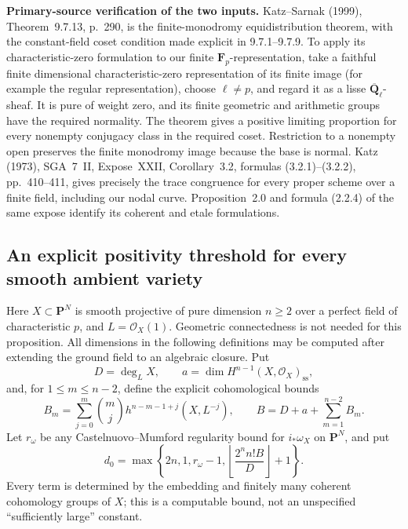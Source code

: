 \par\smallskip\noindent\textbf{Primary-source verification of the two inputs.}
Katz--Sarnak (1999), Theorem~9.7.13, p.~290, is the finite-monodromy
equidistribution theorem, with the constant-field coset condition made
explicit in 9.7.1--9.7.9.  To apply its characteristic-zero formulation
to our finite $\mathbf F_p$-representation, take a faithful finite
dimensional characteristic-zero representation of its finite image
(for example the regular representation), choose $\ell\ne p$, and
regard it as a lisse $\overline{\mathbf Q}_\ell$-sheaf.  It is pure of
weight zero, and its finite geometric and arithmetic groups have the
required normality.  The theorem gives a positive limiting proportion
for every nonempty conjugacy class in the required coset.  Restriction
to a nonempty open preserves the finite monodromy image because the
base is normal.  Katz (1973), SGA~7~II, Expose~XXII, Corollary~3.2,
formulas (3.2.1)--(3.2.2), pp.~410--411, gives precisely the trace
congruence for every proper scheme over a finite field, including
our nodal curve.  Proposition~2.0 and formula (2.2.4) of the same
expose identify its coherent and etale formulations.

\subsection{An explicit positivity threshold for every smooth ambient variety}
\label{subsec:explicit-positivity}

Here $X\subset\mathbf P^N$ is smooth projective of pure dimension
$n\geq2$ over a perfect field of characteristic $p$, and $L=\mathcal O_X(1)$.
Geometric connectedness is not needed for this proposition.  All
dimensions in the following definitions may be computed after extending
the ground field to an algebraic closure.  Put
\[
 D=\deg_L X,\qquad
 a=\dim H^{n-1}(X,\mathcal O_X)_{\mathrm{ss}},
\]
and, for $1\leq m\leq n-2$, define the explicit cohomological bounds
\[
 B_m=\sum_{j=0}^{m}\binom mj
       h^{n-m-1+j}(X,L^{-j}),\qquad
 B=D+a+\sum_{m=1}^{n-2}B_m.
\]
Let $r_\omega$ be any Castelnuovo--Mumford regularity bound for
$i_*\omega_X$ on $\mathbf P^N$, and put
\begin{equation}\label{eq:explicit-d0}
 d_0=\max\left\{2n,1,r_\omega-1,
       \left\lfloor\frac{2^n n!B}{D}\right\rfloor+1\right\}.
\end{equation}
Every term is determined by the embedding and finitely many coherent
cohomology groups of $X$; this is a computable bound, not an unspecified
``sufficiently large'' constant.

